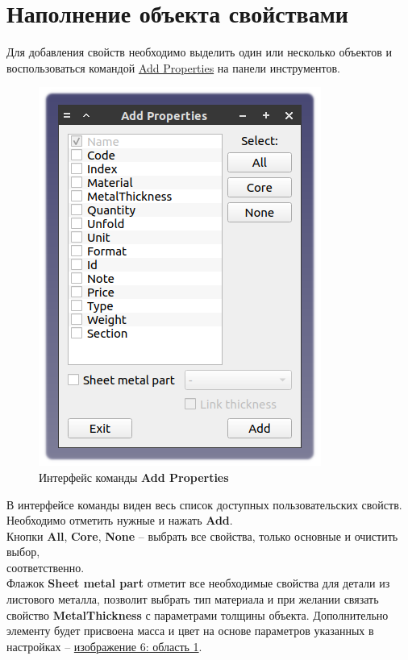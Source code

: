 \documentclass[a4paper,12pt]{article}
\begin{document}
\pagebreak




\section{Наполнение объекта свойствами}

Для добавления свойств необходимо выделить один или несколько объектов и воспользоваться командой \hyperref[sec:5]{Add Properties} на панели инструментов.

\begin{figure}[htp]
	\centering
	\includegraphics[scale=1]{img/properties_add.png}
	\caption{Интерфейс команды \textbf{Add Properties}}
	\label{sec:properties_add}
\end{figure}

В интерфейсе команды виден весь список доступных пользовательских свойств. Необходимо отметить нужные и нажать \textbf{Add}.\\

Кнопки \textbf{All}, \textbf{Core}, \textbf{None} -- выбрать все свойства, только основные и очистить выбор,\\соответственно.\\

Флажок \textbf{Sheet metal part} отметит все необходимые свойства для детали из листового металла, позволит выбрать тип материала и при желании связать свойство \textbf{MetalThickness} с параметрами толщины объекта. Дополнительно элементу будет присвоена масса и цвет на основе параметров указанных в настройках -- \hyperref[sec:pref_sm]{изображение 6: область 1}.\\
\end{document}
